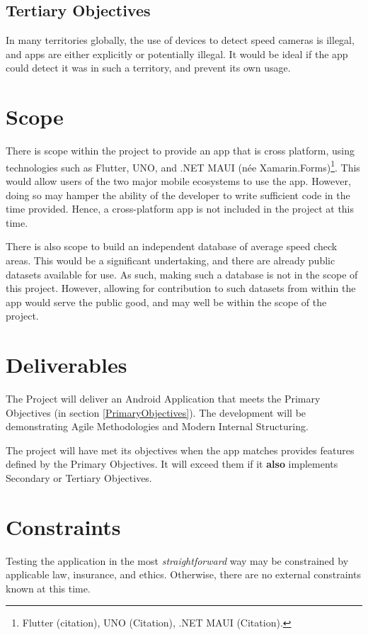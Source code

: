 \documentclass[11pt, a4paper, notitlepage]{report}
\begin{document}
\subsection{Tertiary Objectives}
In many territories globally, the use of devices to detect speed cameras is 
illegal, and apps are either explicitly or potentially illegal. It would be 
ideal if the app could detect it was in such a territory, and prevent its own 
usage.

\section{Scope}
There is scope within the project to provide an app that is cross 
platform, using technologies such as Flutter, UNO, and .NET MAUI (née 
Xamarin.Forms)\footnote{Flutter (citation), UNO (Citation), .NET MAUI (Citation).}. 
This would allow users of the two major mobile ecosystems to use the app. 
However, doing so may hamper the ability of the developer to write sufficient 
code in the time provided.
Hence, a cross-platform app is not included in the project at this time.

There is also scope to build an independent database of average speed check 
areas. This would be a significant undertaking, and there are already public 
datasets available for use. As such, making such a database is not in the scope %
of this project. However, allowing for contribution to such datasets from 
within the app would serve the public good, and may well be within the scope of 
the project.

\section{Deliverables}
The Project will deliver an Android Application that meets the Primary 
Objectives (in section \ref{PrimaryObjectives}). The development will be 
demonstrating Agile Methodologies and Modern Internal Structuring.

The project will have met its objectives when the app matches provides 
features defined by the Primary Objectives. It will exceed them if it 
\textbf{also} implements Secondary or Tertiary Objectives.

\section{Constraints}
Testing the application in the most \textit{straightforward} way may be 
constrained by applicable law, insurance, and ethics. Otherwise, there are no 
external constraints known at this time.
\end{document}
